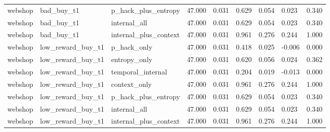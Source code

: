 \begin{tabular}{lllllllll}
webshop & bad_buy_t1 & p_hack_plus_entropy & 47.000 & 0.031 & 0.629 & 0.054 & 0.023 & 0.340 \\
webshop & bad_buy_t1 & internal_all & 47.000 & 0.031 & 0.629 & 0.054 & 0.023 & 0.340 \\
webshop & bad_buy_t1 & internal_plus_context & 47.000 & 0.031 & 0.961 & 0.276 & 0.244 & 1.000 \\
webshop & low_reward_buy_t1 & p_hack_only & 47.000 & 0.031 & 0.418 & 0.025 & -0.006 & 0.000 \\
webshop & low_reward_buy_t1 & entropy_only & 47.000 & 0.031 & 0.620 & 0.056 & 0.024 & 0.362 \\
webshop & low_reward_buy_t1 & temporal_internal & 47.000 & 0.031 & 0.204 & 0.019 & -0.013 & 0.000 \\
webshop & low_reward_buy_t1 & context_only & 47.000 & 0.031 & 0.961 & 0.276 & 0.244 & 1.000 \\
webshop & low_reward_buy_t1 & p_hack_plus_entropy & 47.000 & 0.031 & 0.629 & 0.054 & 0.023 & 0.340 \\
webshop & low_reward_buy_t1 & internal_all & 47.000 & 0.031 & 0.629 & 0.054 & 0.023 & 0.340 \\
webshop & low_reward_buy_t1 & internal_plus_context & 47.000 & 0.031 & 0.961 & 0.276 & 0.244 & 1.000 \\
 \bottomrule
\end{tabular}

